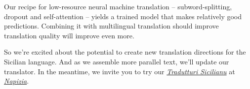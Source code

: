 \documentclass[10pt,letterpaper]{article}
\begin{document}
Our recipe for low-resource neural machine translation -- subword-splitting,
dropout and self-attention -- yields a trained model that makes relatively good predictions.
Combining it with multilingual translation should improve translation quality will improve even more.

So we're excited about the potential to create new translation directions for the Sicilian language.
And as we assemble more parallel text, we'll update our translator.
In the meantime, we invite you to try our 
\textit{\href{https://translate.napizia.com/}{Tradutturi Sicilianu}} at
\textit{\href{https://www.napizia.com/}{Napizia}}.


\hypertarget{bibliography}{}




\end{document}
